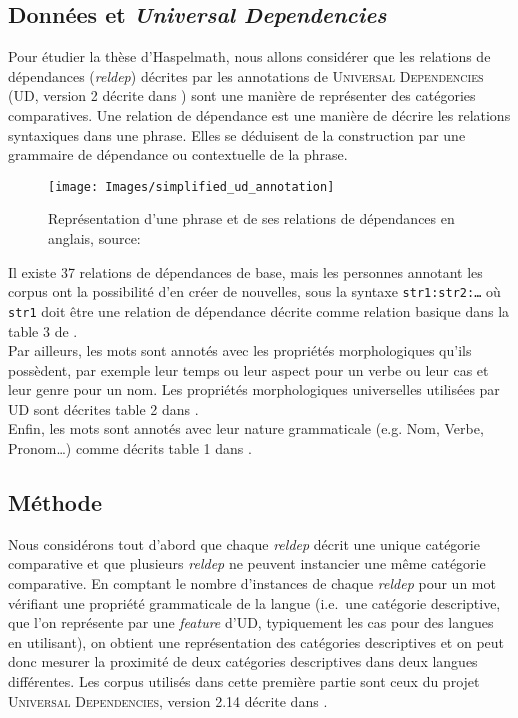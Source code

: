 \documentclass{article}
\begin{document}
\subsection{Données et \emph{Universal Dependencies}}\label{subsec:données}
Pour étudier la thèse d'Haspelmath, nous allons considérer que les relations de dépendances (\textit{reldep}) décrites par les annotations de \textsc{Universal Dependencies} (UD, version 2 décrite dans \cite{UDv2}) sont une manière de représenter des catégories comparatives.
Une relation de dépendance est une manière de décrire les relations syntaxiques dans une phrase.
Elles se déduisent de la construction par une grammaire de dépendance ou contextuelle de la phrase.

\begin{figure}[h]
        \centering
        \texttt{[image: Images/simplified\_ud\_annotation]}
        \caption{Représentation d'une phrase et de ses relations de dépendances en anglais, source:\cite{UDv2}}
\end{figure}

Il existe 37 relations de dépendances de base, mais les personnes annotant les corpus ont la possibilité d'en créer de nouvelles, sous la syntaxe \texttt{str1:str2:\dots} où \texttt{str1} doit être une relation de dépendance décrite comme relation basique dans la table 3 de \cite{UDv2}.\\
Par ailleurs, les mots sont annotés avec les propriétés morphologiques qu'ils possèdent, par exemple leur temps ou leur aspect pour un verbe ou leur cas et leur genre pour un nom.
Les propriétés morphologiques universelles utilisées par UD sont décrites table 2 dans \cite{UDv2}.\\
Enfin, les mots sont annotés avec leur nature grammaticale (e.g. Nom, Verbe, Pronom\dots) comme décrits table 1 dans \cite{UDv2}.

\subsection{Méthode}\label{subsec:méthode}
Nous considérons tout d'abord que chaque \textit{reldep} décrit une unique catégorie comparative et que plusieurs \textit{reldep} ne peuvent instancier une même catégorie comparative.
En comptant le nombre d'instances de chaque \textit{reldep} pour un mot vérifiant une propriété grammaticale de la langue (i.e.\ une catégorie descriptive, que l'on représente par une \textit{feature} d'UD, typiquement les cas pour des langues en utilisant), on obtient une représentation des catégories descriptives et on peut donc mesurer la proximité de deux catégories descriptives dans deux langues différentes.
Les corpus utilisés dans cette première partie sont ceux du projet \textsc{Universal Dependencies}, version 2.14 décrite dans \cite{UD214}.
\end{document}
